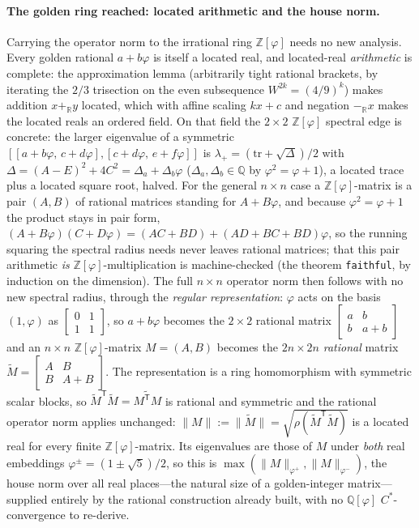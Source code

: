 \documentclass[11pt,letterpaper]{article}
\theoremstyle{plain}
\theoremstyle{definition}
\theoremstyle{remark}
\newcommand{\ZZ}{\mathbb{Z}}
\newcommand{\QQ}{\mathbb{Q}}
\newcommand{\RR}{\mathbb{R}}
\newcommand{\Zphi}{\ZZ[\varphi]}
\begin{document}
\paragraph{The golden ring reached: located arithmetic and the house norm.}
Carrying the operator norm to the irrational ring $\Zphi$ needs no new analysis.
Every golden rational $a+b\varphi$ is itself a located real, and located-real
\emph{arithmetic} is complete: the approximation lemma (arbitrarily tight rational
brackets, by iterating the $2/3$ trisection on the even subsequence
$W^{2k}=(4/9)^k$) makes addition $x+_{\RR}y$ located, which with affine scaling
$kx+c$ and negation $-_{\RR}x$ makes the located reals an ordered field. On that
field the $2\times2$ $\Zphi$ spectral edge is concrete: the larger eigenvalue of a
symmetric $[[a+b\varphi,\,c+d\varphi],[c+d\varphi,\,e+f\varphi]]$ is
$\lambda_+=(\mathrm{tr}+\sqrt\Delta)/2$ with
$\Delta=(A{-}E)^2+4C^2=\Delta_a+\Delta_b\varphi$ ($\Delta_a,\Delta_b\in\QQ$ by
$\varphi^2{=}\varphi{+}1$), a located trace plus a located square root, halved. For
the general $n\times n$ case a $\Zphi$-matrix is a pair $(A,B)$ of rational matrices
standing for $A+B\varphi$, and because $\varphi^2{=}\varphi{+}1$ the product stays in
pair form, $(A+B\varphi)(C+D\varphi)=(AC+BD)+(AD+BC+BD)\varphi$, so the running
squaring the spectral radius needs never leaves rational matrices; that this pair
arithmetic \emph{is} $\Zphi$-multiplication is machine-checked (the theorem
\texttt{faithful}, by induction on the dimension). The full $n\times n$ operator norm
then follows with no new spectral radius, through the \emph{regular representation}:
$\varphi$ acts on the basis $(1,\varphi)$ as
$\left[\begin{smallmatrix}0&1\\1&1\end{smallmatrix}\right]$, so $a+b\varphi$ becomes
the $2\times2$ rational matrix
$\left[\begin{smallmatrix}a&b\\b&a+b\end{smallmatrix}\right]$ and an $n\times n$
$\Zphi$-matrix $M=(A,B)$ becomes the $2n\times2n$ \emph{rational} matrix
$\widetilde M=\left[\begin{smallmatrix}A&B\\B&A+B\end{smallmatrix}\right]$. The
representation is a ring homomorphism with symmetric scalar blocks, so
$\widetilde M^{\mathsf T}\widetilde M=\widetilde{M^{\mathsf T}M}$ is rational and
symmetric and the rational operator norm applies unchanged:
$\lVert M\rVert:=\lVert\widetilde M\rVert=\sqrt{\rho(\widetilde M^{\mathsf T}\widetilde M)}$
is a located real for every finite $\Zphi$-matrix. Its eigenvalues are those of $M$
under \emph{both} real embeddings $\varphi^{\pm}=(1\pm\sqrt5)/2$, so this is
$\max(\lVert M\rVert_{\varphi^+},\lVert M\rVert_{\varphi^-})$, the house norm over all
real places---the natural size of a golden-integer matrix---supplied entirely by the
rational construction already built, with no $\QQ[\varphi]$ $C^\ast$-convergence to
re-derive.
\end{document}
